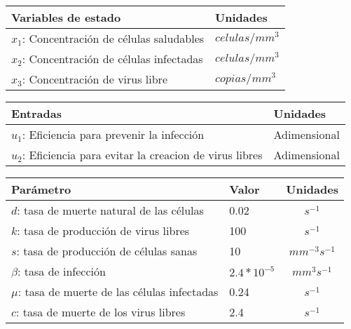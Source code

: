 \documentclass{article}
\begin{document}
    \begin{tabular}{|p{6cm} p{2.5cm}|}
        \hline
        \textbf{Variables de estado} & \textbf{Unidades} \\
        \hline
        $x_1$: Concentración de células saludables & $celulas / mm^3$\\
        $x_2$: Concentración de células infectadas & $celulas / mm^3$\\
        $x_3$: Concentración de virus libre        & $copias / mm^3$\\
        \hline
    \end{tabular}

    \vspace{0.5cm}

    \begin{tabular}{|p{8cm} p{2.5cm}|}
        \hline
        \textbf{Entradas} & \textbf{Unidades} \\
        \hline
        $u_1$: Eficiencia para prevenir la infección              & Adimensional \\
        $u_2$: Eficiencia para evitar la creacion de virus libres & Adimensional \\
        \hline
    \end{tabular}

    \vspace{0.5cm}

    \begin{tabular}{|p{7cm} p{2cm} c|}
        \hline
        \textbf{Parámetro} & \textbf{Valor} & \textbf{Unidades} \\
        \hline
        $d$: tasa de muerte natural de las células      & 0.02            & $s^{-1}$\\
        $k$: tasa de producción de virus libres         & 100             & $s^{-1}$\\
        $s$: tasa de producción de células sanas        & 10              & $mm^{-3} s^{-1}$\\
        $\beta$: tasa de infección                      & $2.4 * 10^{-5}$ & $mm^3 s^{-1}$\\
        $\mu$: tasa de muerte de las células infectadas & 0.24            & $s^{-1}$\\
        $c$: tasa de muerte de los virus libres         & 2.4             & $s^{-1}$\\
        \hline
    \end{tabular}

\vspace{1cm}
\end{document}
